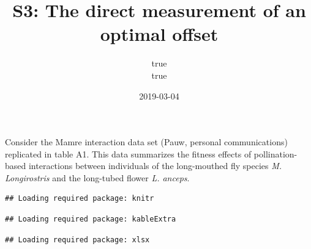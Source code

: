 \documentclass[]{article}
\title{S3: The direct measurement of an optimal offset}
\author{true \\ true}
\date{2019-03-04}
\begin{document}
\maketitle

{
\setcounter{tocdepth}{3}
\tableofcontents
}
Consider the Mamre interaction data set (Pauw, personal communications)
replicated in table A1. This data summarizes the fitness effects of
pollination-based interactions between individuals of the long-mouthed
fly species \emph{M. Longirostris} and the long-tubed flower \emph{L.
anceps}.

\begin{verbatim}
## Loading required package: knitr
\end{verbatim}

\begin{verbatim}
## Loading required package: kableExtra
\end{verbatim}

\begin{verbatim}
## Loading required package: xlsx
\end{verbatim}
\end{document}

